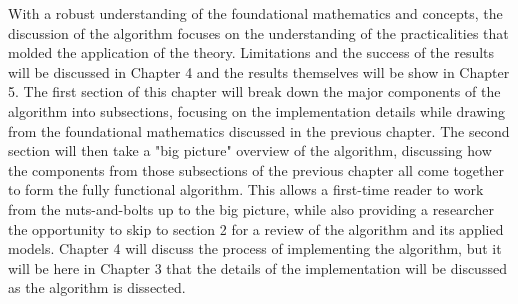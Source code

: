 %
%
%
%
%
%

%
%
%



With a robust understanding of the foundational mathematics and concepts, the discussion of the algorithm focuses on the understanding of the practicalities that molded the application of the theory. Limitations and the success of the results will be discussed in Chapter 4 and the results themselves will be show in Chapter 5. The first section of this chapter will break down the major components of the algorithm into subsections, focusing on the implementation details while drawing from the foundational mathematics discussed in the previous chapter. The second section will then take a "big picture" overview of the algorithm, discussing how the components from those subsections of the previous chapter all come together to form the fully functional algorithm. This allows a first-time reader to work from the nuts-and-bolts up to the big picture, while also providing a researcher the opportunity to skip to section 2 for a review of the algorithm and its applied models. Chapter 4 will discuss the process of implementing the algorithm, but it will be here in Chapter 3 that the details of the implementation will be discussed as the algorithm is dissected.



